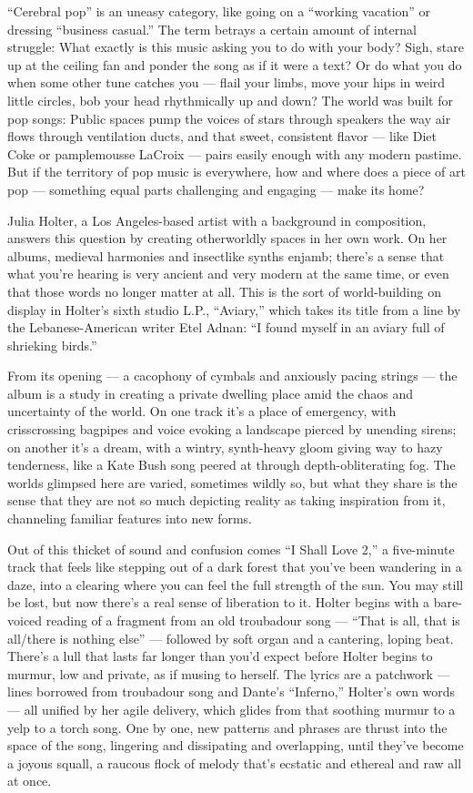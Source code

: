 ``Cerebral pop'' is an uneasy category, like going on a ``working
vacation'' or dressing ``business casual.'' The term betrays a certain
amount of internal struggle: What exactly is this music asking you to do
with your body? Sigh, stare up at the ceiling fan and ponder the song as
if it were a text? Or do what you do when some other tune catches you
--- flail your limbs, move your hips in weird little circles, bob your
head rhythmically up and down? The world was built for pop songs: Public
spaces pump the voices of stars through speakers the way air flows
through ventilation ducts, and that sweet, consistent flavor --- like
Diet Coke or pamplemousse LaCroix --- pairs easily enough with any
modern pastime. But if the territory of pop music is everywhere, how and
where does a piece of art pop --- something equal parts challenging and
engaging --- make its home?

Julia Holter, a Los Angeles-based artist with a background in
composition, answers this question by creating otherworldly spaces in
her own work. On her albums, medieval harmonies and insectlike synths
enjamb; there's a sense that what you're hearing is very ancient and
very modern at the same time, or even that those words no longer matter
at all. This is the sort of world-building on display in Holter's sixth
studio L.P., ``Aviary,'' which takes its title from a line by the
Lebanese-American writer Etel Adnan: ``I found myself in an aviary full
of shrieking birds.''

From its opening --- a cacophony of cymbals and anxiously pacing strings
--- the album is a study in creating a private dwelling place amid the
chaos and uncertainty of the world. On one track it's a place of
emergency, with crisscrossing bagpipes and voice evoking a landscape
pierced by unending sirens; on another it's a dream, with a wintry,
synth-heavy gloom giving way to hazy tenderness, like a Kate Bush song
peered at through depth-obliterating fog. The worlds glimpsed here are
varied, sometimes wildly so, but what they share is the sense that they
are not so much depicting reality as taking inspiration from it,
channeling familiar features into new forms.

Out of this thicket of sound and confusion comes ``I Shall Love 2,'' a
five-minute track that feels like stepping out of a dark forest that
you've been wandering in a daze, into a clearing where you can feel the
full strength of the sun. You may still be lost, but now there's a real
sense of liberation to it. Holter begins with a bare-voiced reading of a
fragment from an old troubadour song --- ``That is all, that is
all/there is nothing else'' --- followed by soft organ and a cantering,
loping beat. There's a lull that lasts far longer than you'd expect
before Holter begins to murmur, low and private, as if musing to
herself. The lyrics are a patchwork --- lines borrowed from troubadour
song and Dante's ``Inferno,'' Holter's own words --- all unified by her
agile delivery, which glides from that soothing murmur to a yelp to a
torch song. One by one, new patterns and phrases are thrust into the
space of the song, lingering and dissipating and overlapping, until
they've become a joyous squall, a raucous flock of melody that's
ecstatic and ethereal and raw all at once.

